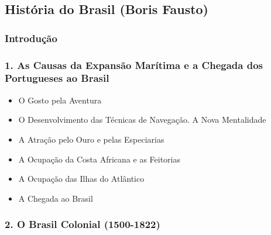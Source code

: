 \documentclass[a4paper,12pt]{article}[abntex2]
\begin{document}
\subsection{História do Brasil (Boris Fausto)}
\subsubsection*{Introdução}

\subsubsection*{1. As Causas da Expansão Marítima e a Chegada dos Portugueses ao Brasil}

\begin{itemize}
\item O Gosto pela Aventura
\item O Desenvolvimento das Técnicas de Navegação. A Nova Mentalidade
\item A Atração pelo Ouro e pelas Especiarias
\item A Ocupação da Costa Africana e as Feitorias
\item A Ocupação das Ilhas do Atlântico
\item A Chegada ao Brasil
\end{itemize}
\subsubsection*{2. O Brasil Colonial (1500-1822)}
\end{document}
